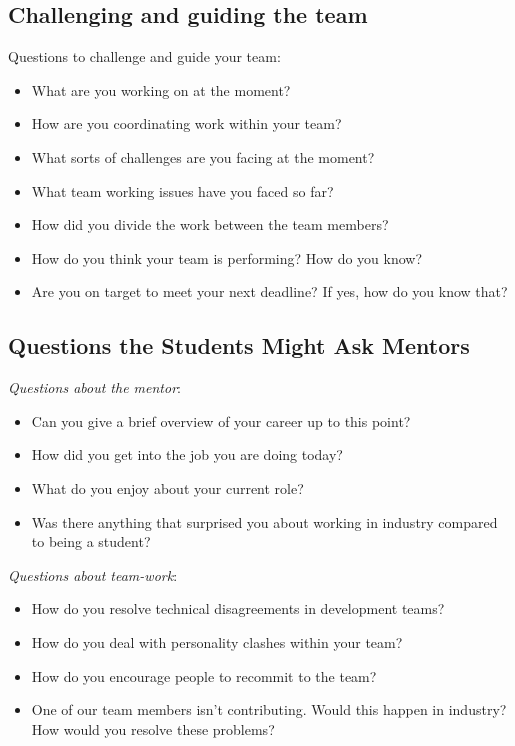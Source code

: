 \documentclass[
]{book}
\providecommand{\tightlist}{%
  \setlength{\itemsep}{0pt}\setlength{\parskip}{0pt}}
\begin{document}
\hypertarget{challenging}{%
\subsection{Challenging and guiding the team}\label{challenging}}

Questions to challenge and guide your team:

\begin{itemize}
\tightlist
\item
  What are you working on at the moment?
\item
  How are you coordinating work within your team?
\item
  What sorts of challenges are you facing at the moment?
\item
  What team working issues have you faced so far?
\item
  How did you divide the work between the team members?
\item
  How do you think your team is performing? How do you know?
\item
  Are you on target to meet your next deadline? If yes, how do you know that?
\end{itemize}

\hypertarget{studentqs}{%
\subsection{Questions the Students Might Ask Mentors}\label{studentqs}}

\emph{Questions about the mentor}:

\begin{itemize}
\tightlist
\item
  Can you give a brief overview of your career up to this point?
\item
  How did you get into the job you are doing today?
\item
  What do you enjoy about your current role?
\item
  Was there anything that surprised you about working in industry compared to being a student?
\end{itemize}

\emph{Questions about team-work}:

\begin{itemize}
\tightlist
\item
  How do you resolve technical disagreements in development teams?
\item
  How do you deal with personality clashes within your team?
\item
  How do you encourage people to recommit to the team?
\item
  One of our team members isn't contributing. Would this happen in industry? How would you resolve these problems?
\end{itemize}
\end{document}
